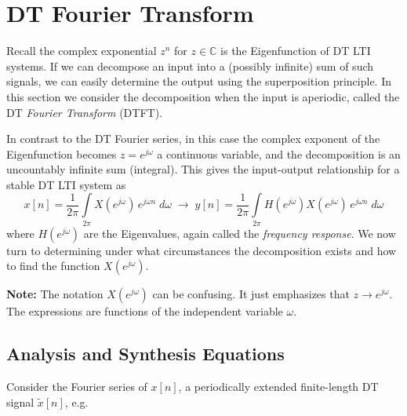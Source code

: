 \section{DT Fourier Transform}

Recall the complex exponential $z^{n}$ for $z\in\mathbb{C}$ is the Eigenfunction of DT LTI systems. If we can decompose an input into a (possibly infinite) sum of such signals, we can easily determine the output using the superposition principle. In this section we consider the decomposition when the input is aperiodic, called the DT \emph{Fourier Transform} (DTFT).

In contrast to the DT Fourier series, in this case the complex exponent of the Eigenfunction becomes $z = e^{j\omega}$ a continuous variable, and the decomposition is an uncountably infinite sum (integral). This gives the input-output relationship for a stable DT LTI system as
\[
x[n] = \frac{1}{2\pi}\int\limits_{2\pi} X\left(e^{j\omega}\right) \, e^{j \omega n}\; d\omega \;\longrightarrow\; y[n] = \frac{1}{2\pi}\int\limits_{2\pi} H\left(e^{j\omega}\right) X\left(e^{j\omega}\right) \, e^{j \omega n}\; d\omega
\]
where $H\left(e^{j \omega}\right)$ are the Eigenvalues, again called the \emph{frequency response}. We now turn to determining under what circumstances the decomposition exists and how to find the function $X\left(e^{j\omega}\right)$.

\textbf{Note:} The notation $X\left(e^{j\omega}\right)$ can be confusing. It just emphasizes that $z \rightarrow e^{j\omega}$. The expressions are functions of the independent variable $\omega$.

\subsection{Analysis and Synthesis Equations}

Consider the Fourier series of $x[n]$, a periodically extended finite-length DT signal $\tilde{x}[n]$, e.g.

